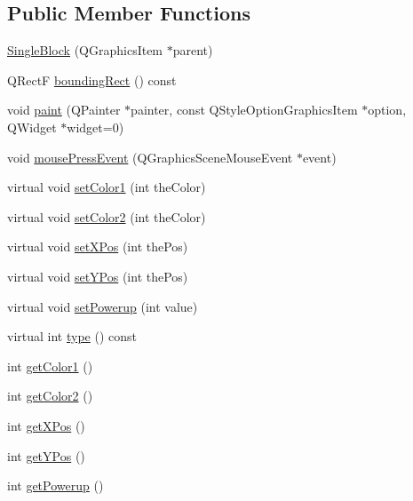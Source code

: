 \subsection*{Public Member Functions}
\begin{DoxyCompactItemize}
\item 
\hyperlink{class_single_block_a7b317497065c067dde1c034ef8f3e0ee}{SingleBlock} (QGraphicsItem $\ast$parent)
\item 
QRectF \hyperlink{class_single_block_a96b8d4a017cce8eaf08a09632e7f9907}{boundingRect} () const 
\item 
void \hyperlink{class_single_block_a397006b22a2f8dc67e27660f67546880}{paint} (QPainter $\ast$painter, const QStyleOptionGraphicsItem $\ast$option, QWidget $\ast$widget=0)
\item 
void \hyperlink{class_single_block_a9616ca814fe8e82b0ec9c7448d5b2415}{mousePressEvent} (QGraphicsSceneMouseEvent $\ast$event)
\item 
virtual void \hyperlink{class_single_block_a9a3f135aaaf56aa7765dad47f6bb8f36}{setColor1} (int theColor)
\item 
virtual void \hyperlink{class_single_block_ad59aa2654804afcc4035695765399fc1}{setColor2} (int theColor)
\item 
virtual void \hyperlink{class_single_block_af53a21a1faae0876aa63c907ab6ddc23}{setXPos} (int thePos)
\item 
virtual void \hyperlink{class_single_block_a0de6704830cc075cabdf40b5894e7fa9}{setYPos} (int thePos)
\item 
virtual void \hyperlink{class_single_block_a6d5eeb09997cf10a0518f8c8fdb1cd7c}{setPowerup} (int value)
\item 
virtual int \hyperlink{class_single_block_a1ee84715ceaa1c72cc5ad5d627f1ec67}{type} () const 
\item 
int \hyperlink{class_single_block_aa46aacef2ede822289499a2a41f00054}{getColor1} ()
\item 
int \hyperlink{class_single_block_a6438d2e49ace6f57711ee53f75b02734}{getColor2} ()
\item 
int \hyperlink{class_single_block_aafaab9f0e0f348572a805d01a5d1a5eb}{getXPos} ()
\item 
int \hyperlink{class_single_block_a73a4ed9e378d1afe20d3451f74b61d93}{getYPos} ()
\item 
int \hyperlink{class_single_block_a126f70ebd4ac107f8d9b770f157afdf0}{getPowerup} ()
\end{DoxyCompactItemize}

